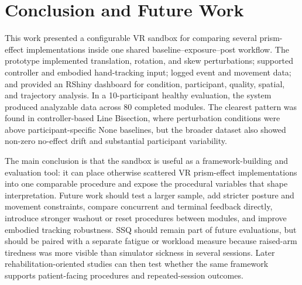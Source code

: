 \section*{Conclusion and Future Work}

This work presented a configurable VR sandbox for comparing several prism-effect implementations inside one shared baseline--exposure--post workflow. The prototype implemented translation, rotation, and skew perturbations; supported controller and embodied hand-tracking input; logged event and movement data; and provided an RShiny dashboard for condition, participant, quality, spatial, and trajectory analysis. In a 10-participant healthy evaluation, the system produced analyzable data across 80 completed modules. The clearest pattern was found in controller-based Line Bisection, where perturbation conditions were above participant-specific None baselines, but the broader dataset also showed non-zero no-effect drift and substantial participant variability.

The main conclusion is that the sandbox is useful as a framework-building and evaluation tool: it can place otherwise scattered VR prism-effect implementations into one comparable procedure and expose the procedural variables that shape interpretation. Future work should test a larger sample, add stricter posture and movement constraints, compare concurrent and terminal feedback directly, introduce stronger washout or reset procedures between modules, and improve embodied tracking robustness. SSQ should remain part of future evaluations, but should be paired with a separate fatigue or workload measure because raised-arm tiredness was more visible than simulator sickness in several sessions. Later rehabilitation-oriented studies can then test whether the same framework supports patient-facing procedures and repeated-session outcomes.
